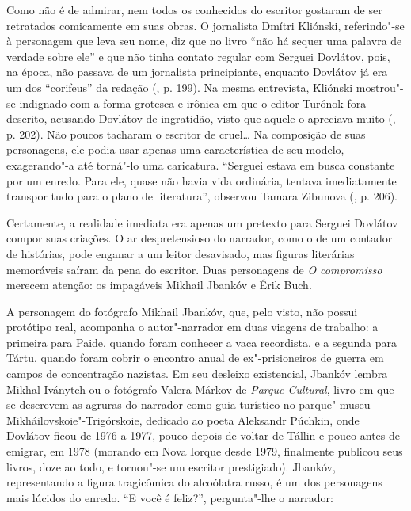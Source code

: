 Como não é de admirar, nem todos os conhecidos do escritor gostaram de
ser retratados comicamente em suas obras. O jornalista Dmítri Kliónski,
referindo"-se à personagem que leva seu nome, diz que no livro ``não há
sequer uma palavra de verdade sobre ele'' e que não tinha contato
regular com Serguei Dovlátov, pois, na época, não passava de um
jornalista principiante, enquanto Dovlátov já era um dos ``corifeus'' da
redação (, p. 199). Na mesma entrevista, Kliónski mostrou"-se
indignado com a forma grotesca e irônica em que o editor Turónok fora
descrito, acusando Dovlátov de ingratidão, visto que aquele o apreciava
muito (, p. 202). Não poucos tacharam o escritor de cruel\ldots{} Na
composição de suas personagens, ele podia usar apenas uma característica
de seu modelo, exagerando"-a até torná"-lo uma caricatura. ``Serguei
estava em busca constante por um enredo. Para ele, quase não havia vida
ordinária, tentava imediatamente transpor tudo para o plano de
literatura'', observou Tamara Zibunova (, p. 206).

\begin{center}
{}
\end{center}

Certamente, a realidade imediata era apenas um pretexto para Serguei
Dovlátov compor suas criações. O ar despretensioso do narrador, como o
de um contador de histórias, pode enganar a um leitor desavisado, mas
figuras literárias memoráveis saíram da pena do escritor. Duas
personagens de \emph{O compromisso} merecem atenção: os impagáveis
Mikhail Jbankóv e Érik Buch.

A personagem do fotógrafo Mikhail Jbankóv, que, pelo visto, não possui
protótipo real, acompanha o autor"-narrador em duas viagens de trabalho:
a primeira para Paide, quando foram conhecer a vaca recordista, e a
segunda para Tártu, quando foram cobrir o encontro anual de
ex"-prisioneiros de guerra em campos de concentração nazistas. Em seu
desleixo existencial, Jbankóv lembra Mikhal Iványtch ou o fotógrafo
Valera Márkov de \emph{Parque Cultural}, livro em que se descrevem as
agruras do narrador como guia turístico no parque"-museu
Mikháilovskoie"-Trigórskoie, dedicado ao poeta Aleksandr Púchkin, onde
Dovlátov ficou de 1976 a 1977, pouco depois de voltar de Tállin e pouco
antes de emigrar, em 1978 (morando em Nova Iorque desde 1979, finalmente
publicou seus livros, doze ao todo, e tornou"-se um escritor
prestigiado). Jbankóv, representando a figura tragicômica do alcoólatra
russo, é um dos personagens mais lúcidos do enredo. ``E você é feliz?'',
pergunta"-lhe o narrador:

